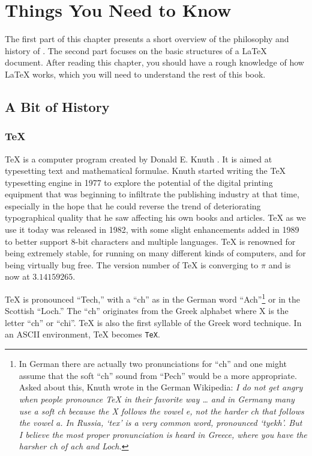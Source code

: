
\chapter{Things You Need to Know}
\begin{intro}
The first part of this chapter presents a short
overview of the philosophy and history of \LaTeXe. The second part
focuses on the basic structures of a \LaTeX{} document.
After reading this chapter, you should have a rough knowledge
of how \LaTeX{} works, which you will need to understand the rest
of this book.
\end{intro}

\section{A Bit of History}
\subsection{\TeX}

\TeX{} is a computer program created by Donald
E. Knuth \cite{texbook}. It is aimed at typesetting text and
mathematical formulae. Knuth started writing the \TeX{} typesetting
engine in 1977 to explore the potential of the digital printing
equipment that was beginning to infiltrate the publishing industry at
that time, especially in the hope that he could reverse the trend of
deteriorating typographical quality that he saw affecting his own
books and articles. \TeX{} as we use it today was released in 1982,
with some slight enhancements added in 1989 to better support 8-bit
characters and multiple languages. \TeX{} is renowned for being
extremely stable, for running on many different kinds of computers,
and for being virtually bug free. The version number of \TeX{} is
converging to $\pi$ and is now at $3.14159265$.


\TeX{} is pronounced ``Tech,'' with a ``ch'' as in the German word
``Ach''\footnote{In German there are actually two pronunciations for ``ch''
and one might assume that the soft ``ch'' sound from ``Pech'' would be a
more appropriate. Asked about this, Knuth wrote in the German Wikipedia:
\emph{I do not get angry when people pronounce \TeX{} in their favorite way
\ldots{} and in Germany many use a soft ch because the X follows the vowel
e, not the harder ch that follows the vowel a. In Russia, `tex' is a very
common word, pronounced `tyekh'. But I believe the most proper pronunciation
is heard in Greece, where you have the harsher ch of ach and Loch.}}
or in the Scottish ``Loch.'' The ``ch'' originates from the Greek
alphabet where X is the letter ``ch'' or ``chi''. \TeX{} is also the first syllable
of the Greek word technique. In an ASCII environment, \TeX{}
becomes \texttt{TeX}.


